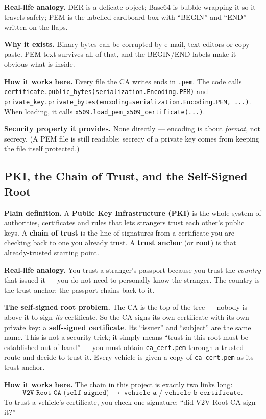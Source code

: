 \documentclass[11pt,a4paper]{report}
\begin{document}
\textbf{Real-life analogy.} DER is a delicate object; Base64 is bubble-wrapping
it so it travels safely; PEM is the labelled cardboard box with ``BEGIN'' and
``END'' written on the flaps.

\textbf{Why it exists.} Binary bytes can be corrupted by e-mail, text editors or
copy-paste. PEM text survives all of that, and the BEGIN/END labels make it
obvious what is inside.

\textbf{How it works here.} Every file the CA writes ends in \texttt{.pem}. The
code calls \texttt{certificate.public\_bytes(serialization.Encoding.PEM)} and
\texttt{private\_key.private\_bytes(encoding=serialization.Encoding.PEM, ...)}.
When loading, it calls \texttt{x509.load\_pem\_x509\_certificate(...)}.

\textbf{Security property it provides.} None directly --- encoding is about
\emph{format}, not secrecy. (A PEM file is still readable; secrecy of a private
key comes from keeping the file itself protected.)

\subsection{PKI, the Chain of Trust, and the Self-Signed Root}
\textbf{Plain definition.} A \textbf{Public Key Infrastructure (PKI)} is the
whole system of authorities, certificates and rules that lets strangers trust
each other's public keys. A \textbf{chain of trust} is the line of signatures
from a certificate you are checking back to one you already trust. A
\textbf{trust anchor} (or \textbf{root}) is that already-trusted starting point.

\textbf{Real-life analogy.} You trust a stranger's passport because you trust the
\emph{country} that issued it --- you do not need to personally know the
stranger. The country is the trust anchor; the passport chains back to it.

\textbf{The self-signed root problem.} The CA is the top of the tree --- nobody
is above it to sign \emph{its} certificate. So the CA signs its own certificate
with its own private key: a \textbf{self-signed certificate}. Its ``issuer'' and
``subject'' are the same name. This is not a security trick; it simply means
``trust in this root must be established out-of-band'' --- you must obtain
\texttt{ca\_cert.pem} through a trusted route and decide to trust it. Every
vehicle is given a copy of \texttt{ca\_cert.pem} as its trust anchor.

\textbf{How it works here.} The chain in this project is exactly two links long:
\[
\texttt{V2V-Root-CA (self-signed)} \;\longrightarrow\;
\texttt{vehicle-a / vehicle-b certificate}.
\]
To trust a vehicle's certificate, you check one signature: ``did V2V-Root-CA
sign it?''
\end{document}
